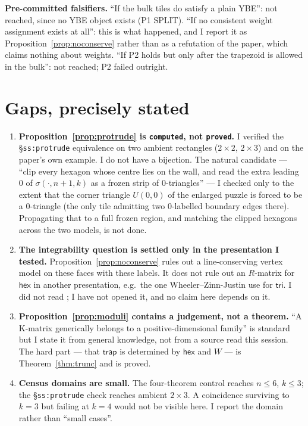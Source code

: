 \documentclass[11pt]{article}
\theoremstyle{definition}
\newcommand{\hex}{\mathsf{hex}}
\newcommand{\trap}{\mathsf{trap}}
\newcommand{\tritile}{\mathsf{tri}}
\begin{document}
\noindent\textbf{Pre-committed falsifiers.} ``If the bulk tiles do satisfy a
plain YBE'': not reached, since no YBE object exists (P1 SPLIT).
``If no consistent weight assignment exists at all'': this is what happened, and
I report it as Proposition~\ref{prop:noconserve} rather than as a refutation of
the paper, which claims nothing about weights. ``If P2 holds but only after the
trapezoid is allowed in the bulk'': not reached; P2 failed outright.

\section{Gaps, precisely stated}

\begin{enumerate}
\item \textbf{Proposition~\ref{prop:protrude} is \texttt{computed}, not
\texttt{proved}.} I verified the \S\texttt{ss:protrude} equivalence on two
ambient rectangles ($2\times2$, $2\times3$) and on the paper's own example. I do
not have a bijection. The natural candidate --- ``clip every hexagon whose
centre lies on the wall, and read the extra leading $0$ of
$\sigma(\cdot,n+1,k)$ as a frozen strip of $0$-triangles'' --- I checked only to
the extent that the corner triangle $U(0,0)$ of the enlarged puzzle is forced to
be a $0$-triangle (the only tile admitting two $0$-labelled boundary edges
there). Propagating that to a full frozen region, and matching the clipped
hexagons across the two models, is not done.

\item \textbf{The integrability question is settled only in the presentation I
tested.} Proposition~\ref{prop:noconserve} rules out a line-conserving vertex
model on these faces with these labels. It does not rule out an $R$-matrix for
$\hex$ in another presentation, e.g.\ the one Wheeler--Zinn-Justin use for
$\tritile$. I did not read \cite{WZ}; I have not opened it, and no claim here
depends on it.

\item \textbf{Proposition~\ref{prop:moduli} contains a judgement, not a
theorem.} ``A K-matrix generically belongs to a positive-dimensional family'' is
standard but I state it from general knowledge, not from a source read this
session. The hard part --- that $\trap$ is determined by $\hex$ and $W$ --- is
Theorem~\ref{thm:trunc} and is proved.

\item \textbf{Census domains are small.} The four-theorem control reaches
$n\le6$, $k\le3$; the \S\texttt{ss:protrude} check reaches ambient $2\times3$.
A coincidence surviving to $k=3$ but failing at $k=4$ would not be visible here.
I report the domain rather than ``small cases''.
\end{enumerate}
\end{document}
